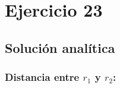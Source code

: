 \newpage
\clearpage

\section{Ejercicio 23}



\newpage
\subsection{Solución analítica}



\newpage
\subsubsection{\texorpdfstring{Distancia entre $r_1$ y $r_2$:}{}}


%

%

